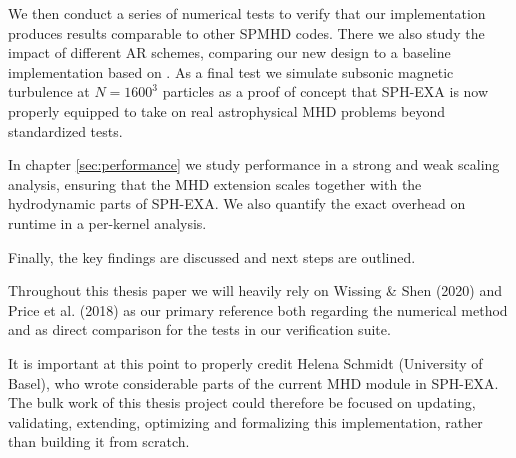 We then conduct a series of numerical tests to verify that our implementation produces results comparable to other SPMHD codes. There we also study the impact of different AR schemes, comparing our new design to a baseline implementation based on \cite{WissingShen2020}. As a final test we simulate subsonic magnetic turbulence at $N=1600^3$ particles as a proof of concept that SPH-EXA is now properly equipped to take on real astrophysical MHD problems beyond standardized tests. 

In chapter \ref{sec:performance} we study performance in a strong and weak scaling analysis, ensuring that the MHD extension scales together with the hydrodynamic parts of SPH-EXA. We also quantify the exact overhead on runtime in a per-kernel analysis. 

Finally, the key findings are discussed and next steps are outlined. 

Throughout this thesis paper we will heavily rely on Wissing \& Shen (2020) \cite{WissingShen2020} and Price et al. (2018) \cite{Price2018} as our primary reference both regarding the numerical method and as direct comparison for the tests in our verification suite. 

It is important at this point to properly credit Helena Schmidt (University of Basel), who wrote considerable parts of the current MHD module in SPH-EXA. The bulk work of this thesis project could therefore be focused on updating, validating, extending, optimizing and formalizing this implementation, rather than building it from scratch. 